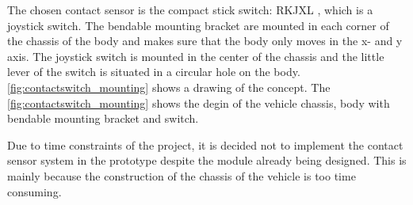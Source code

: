 The chosen contact sensor is the compact stick switch: RKJXL \citep{RKJXL}, which is a joystick switch. The bendable mounting bracket are mounted in each corner of the chassis of the body and makes sure that the body only moves in the x- and y axis. The joystick switch is mounted in the center of the chassis and the little lever of the switch is situated in a circular hole on the body. \autoref{fig:contactswitch_mounting} shows a drawing of the concept. The \autoref{fig:contactswitch_mounting} shows the degin of the vehicle chassis, body with bendable mounting bracket and switch.  

Due to time constraints of the project, it is decided not to implement the contact sensor system in the prototype despite the module already being designed. This is mainly because the construction of the chassis of the vehicle is too time consuming.
